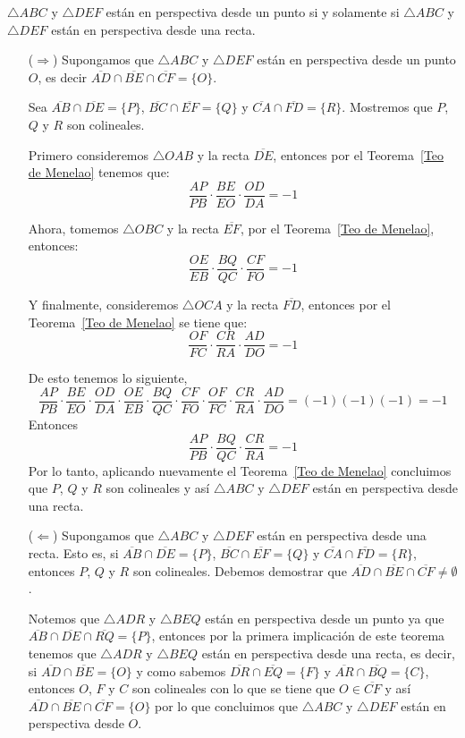 \begin{teo}
$\triangle ABC$ y $\triangle DEF$ están en perspectiva desde un punto si y solamente si $\triangle ABC$ y $\triangle DEF$ están en perspectiva desde una recta. 
\end{teo}
\begin{dem}
\begin{enumerate}
\item[($\Rightarrow$)]Supongamos que $\triangle ABC$ y $\triangle DEF$ están en perspectiva desde un punto $O$, es decir $\overline{AD}\cap\overline{BE}\cap\overline{CF}=\{O\}$.

Sea $\overline{AB}\cap\overline{DE}=\{P\}$, $\overline{BC}\cap\overline{EF}=\{Q\}$ y $\overline{CA}\cap\overline{FD}=\{R\}$. Mostremos que $P$, $Q$ y $R$ son colineales.

Primero consideremos $\triangle OAB$ y la recta $\overline{DE}$, entonces por el Teorema~\ref{Teo de Menelao} tenemos que:
$$\frac{AP}{PB}\cdot\frac{BE}{EO}\cdot\frac{OD}{DA}=-1$$

Ahora, tomemos $\triangle OBC$ y la recta $\overline{EF}$, por el Teorema~\ref{Teo de Menelao}, entonces:
$$\frac{OE}{EB}\cdot\frac{BQ}{QC}\cdot\frac{CF}{FO}=-1$$

Y finalmente, consideremos $\triangle OCA$ y la recta $\overline{FD}$, entonces por el Teorema~\ref{Teo de Menelao} se tiene que:
$$\frac{OF}{FC}\cdot\frac{CR}{RA}\cdot\frac{AD}{DO}=-1$$

De esto tenemos lo siguiente,
$$\frac{AP}{PB}\cdot\frac{BE}{EO}\cdot\frac{OD}{DA}\cdot\frac{OE}{EB}\cdot\frac{BQ}{QC}\cdot\frac{CF}{FO}\cdot\frac{OF}{FC}\cdot\frac{CR}{RA}\cdot\frac{AD}{DO}=(-1)(-1)(-1)=-1$$
Entonces
$$\frac{AP}{PB}\cdot\frac{BQ}{QC}\cdot\frac{CR}{RA}=-1$$
Por lo tanto, aplicando nuevamente el Teorema~\ref{Teo de Menelao} concluimos que $P$, $Q$ y $R$ son colineales y así $\triangle ABC$ y $\triangle DEF$ están en perspectiva desde una recta.

\item[($\Leftarrow$)] Supongamos que $\triangle ABC$ y $\triangle DEF$ están en perspectiva desde una recta. Esto es, si $\overline{AB}\cap\overline{DE}=\{P\}$, $\overline{BC}\cap\overline{EF}=\{Q\}$ y $\overline{CA}\cap\overline{FD}=\{R\}$, entonces $P$, $Q$ y $R$ son colineales. Debemos demostrar que $\overline{AD}\cap\overline{BE}\cap\overline{CF}\neq\emptyset$. 

Notemos que $\triangle ADR$ y $\triangle BEQ$ están en perspectiva desde un punto ya que $\overline{AB}\cap\overline{DE}\cap\overline{RQ}=\{P\}$, entonces por la primera implicación de este teorema tenemos que $\triangle ADR$ y $\triangle BEQ$ están en perspectiva desde una recta, es decir, si $\overline{AD}\cap\overline{BE}=\{O\}$ y como sabemos $\overline{DR}\cap\overline{EQ}=\{F\}$ y $\overline{AR}\cap\overline{BQ}=\{C\}$, entonces $O$, $F$ y $C$ son colineales con lo que se tiene que $O\in\overline{CF}$ y así $\overline{AD}\cap\overline{BE}\cap\overline{CF}=\{O\}$ por lo que concluimos que $\triangle ABC$ y $\triangle DEF$ están en perspectiva desde $O$. 
\end{enumerate}
\end{dem}

